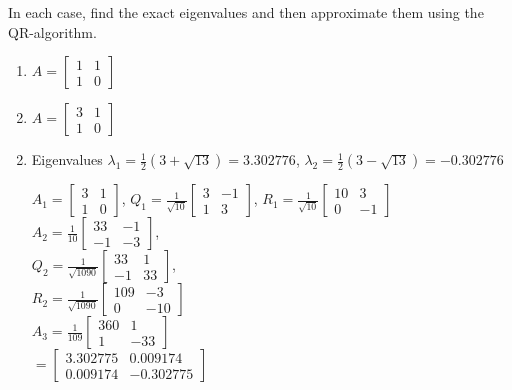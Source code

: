 \documentclass{ximera}
\begin{document}
\begin{problem}
In each case, find the exact eigenvalues and then approximate them using the QR-algorithm.


\begin{enumerate}
\item $A = \left[ \begin{array}{rr}
1 & 1 \\
1 & 0
\end{array}\right]$
\item $A = \left[ \begin{array}{rr}
3 & 1 \\
1 & 0
\end{array}\right]$
\end{enumerate}
\begin{hint}
\begin{enumerate} 
\setcounter{enumi}{1}
\item  Eigenvalues $\lambda_{1} = \frac{1}{2}(3 + \sqrt{13}) = 3.302776$, $\lambda_{2} = \frac{1}{2}(3 - \sqrt{13}) = -0.302776$

$A_{1} = \left[ \begin{array}{rr}
3 & 1 \\
1 & 0
\end{array}\right]$, $Q_{1} = \frac{1}{\sqrt{10}}\left[ \begin{array}{rr}
3 & -1 \\
1 & 3
\end{array}\right]$, $R_{1} = \frac{1}{\sqrt{10}}\left[ \begin{array}{rr}
10 & 3 \\
0 & -1
\end{array}\right]$ \\
$A_{2} = \frac{1}{10}\left[ \begin{array}{rr}
33 & -1 \\
-1 & -3
\end{array}\right]$, \\ $Q_{2} = \frac{1}{\sqrt{1090}}\left[ \begin{array}{rr}
33 & 1 \\
-1 & 33
\end{array}\right]$, \\ $R_{2} = \frac{1}{\sqrt{1090}}\left[ \begin{array}{rr}
109 & -3 \\
0 & -10
\end{array}\right]$ \\
$A_{3} = \frac{1}{109}\left[ \begin{array}{rr}
360 & 1 \\
1 & -33
\end{array}\right]$ \\ ${} = \left[ \begin{array}{rr}
3.302775 & 0.009174 \\
0.009174 & -0.302775
\end{array}\right]$

\end{enumerate}
\end{hint}
\end{problem}
\end{document}
